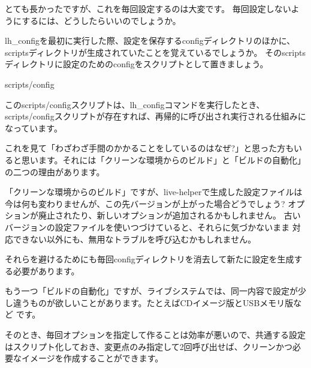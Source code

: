 \documentclass[mingoth,a4paper]{jsarticle}
\begin{document}
\newpage

とても長かったですが、これを毎回設定するのは大変です。
毎回設定しないようにするには、どうしたらいいのでしょうか。

lh\_configを最初に実行した際、設定を保存するconfigディレクトリのほかに、
scriptsディレクトリが生成されていたことを覚えているでしょうか。
そのscriptsディレクトリに設定のためのconfigをスクリプトとして置きましょう。

scripts/config



このscripts/configスクリプトは、lh\_configコマンドを実行したとき、scripts/configスクリプトが存在すれば、再帰的に呼び出され実行される仕組みになっています。

これを見て「わざわざ手間のかかることをしているのはなぜ?」と思った方もいると思います。それには「クリーンな環境からのビルド」と「ビルドの自動化」の二つの理由があります。

「クリーンな環境からのビルド」ですが、live-helperで生成した設定ファイルは
今は何も変わりませんが、この先バージョンが上がった場合どうでしょう?
オプションが廃止されたり、新しいオプションが追加されるかもしれません。
古いバージョンの設定ファイルを使いつづけていると、それらに気づかないまま
対応できない以外にも、無用なトラブルを呼び込むかもしれません。

それらを避けるためにも毎回configディレクトリを消去して新たに設定を生成す
る必要があります。

もう一つ「ビルドの自動化」ですが、ライブシステムでは、同一内容で設定が少
し違うものが欲しいことがあります。たとえばCDイメージ版とUSBメモリ版など
です。

そのとき、毎回オプションを指定して作ることは効率が悪いので、共通する設定はスクリプト化しておき、変更点のみ指定して2回呼び出せば、クリーンかつ必要なイメージを作成することができます。
\end{document}
